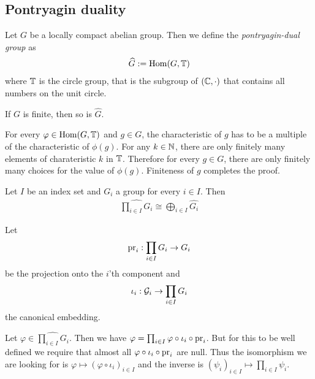 \subsection{Pontryagin duality}

\begin{Definition}
	Let $G$ be a locally compact abelian group. Then we define the \emph{pontryagin-dual group} as
	\begin{align*}
		\widehat{G} := \operatorname{Hom}(G,\mathbb{T})
	\end{align*}
	where $\mathbb{T}$ is the circle group, that is the subgroup of $(\mathbb{C},\cdot)$ that contains all numbers on the unit circle.
\end{Definition}

\begin{Lemma}
	If $G$ is finite, then so is $\widehat{G}$.
\end{Lemma}

\proof
	For every $\varphi \in \operatorname{Hom}(G,\mathbb{T})$ and $g \in G$, the characteristic of $g$ has to be a multiple of the characteristic of $\phi(g)$.
	For any $k \in \mathbb{N}$, there are only finitely many elements of charateristic $k$ in $\mathbb{T}$.
	Therefore for every $g \in G$, there are only finitely many choices for the value of $\phi(g)$.
	Finiteness of $g$ completes the proof.
\endproof

\begin{Lemma}
	\label{the_zero_divisor_problem:pontryagin_duality:lemma_dual_product}
	Let $I$ be an index set and $G_i$ a group for every $i \in I$. Then
	\begin{align*}
		\widehat{\prod_{i \in I} G_i} \cong \bigoplus_{i \in I} \widehat{G_i}
	\end{align*}
\end{Lemma}

\proof
	Let
	\begin{align*}
		\operatorname{pr}_i: \prod_{i \in I} G_i \to G_i
	\end{align*}
	be the projection onto the $i$'th component and
	\begin{align*}
		\iota_i: \mathcal{G}_i \to \prod_{i \in I} G_i
	\end{align*}
	the canonical embedding.

	Let $\varphi \in \widehat{\prod_{i \in I} G_i}$. Then we have
	$\varphi = \prod_{i \in I} \varphi \circ \iota_i \circ \operatorname{pr}_i$.
	But for this to be well defined we require that almost all $\varphi \circ \iota_i \circ \operatorname{pr}_i$ are null.
	Thus the isomorphism we are looking for is $\varphi \mapsto (\varphi \circ \iota_i)_{i \in I}$ and the inverse is $(\psi_i)_{i \in I} \mapsto \prod_{i \in I} \psi_i$.
\endproof

